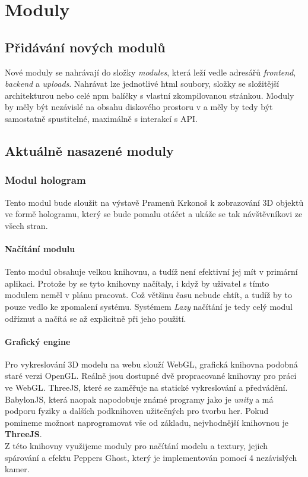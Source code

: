 \chapter{Moduly}

\section{Přidávání nových modulů}
Nové moduly se nahrávají do složky \textit{modules},
která leží vedle adresářů \textit{frontend}, \textit{backend} a \textit{uploads}.
Nahrávat lze jednotlivé html soubory, složky se složitější architekturou nebo
celé npm balíčky s vlastní zkompilovanou stránkou. Moduly by měly být nezávislé na
obsahu diskového prostoru v  a měly by tedy být samostatně spustitelné,
maximálně s interakcí s API.

\section{Aktuálně nasazené moduly}

\subsection{Modul hologram}
Tento modul bude sloužit na výstavě Pramenů Krkonoš k zobrazování 3D objektů ve formě hologramu,
který se bude pomalu otáčet a ukáže se tak návštěvníkovi ze všech stran.

\subsubsection{Načítání modulu}
Tento modul obsahuje velkou knihovnu, a tudíž není efektivní jej mít v primární aplikaci.
Protože by se tyto knihovny načítaly, i když by uživatel s tímto modulem neměl v plánu pracovat.
Což většinu času nebude chtít, a tudíž by to pouze vedlo ke zpomalení systému.
Systémem \textit{Lazy} načítání je tedy celý modul odříznut a načítá se až explicitně při jeho použití.

\subsubsection{Grafický engine}
Pro vykreslování 3D modelu na webu slouží WebGL, grafická knihovna podobná staré verzi OpenGL.
Reálně jsou dostupné dvě propracované knihovny pro práci ve WebGL.
ThreeJS, které se zaměřuje na statické vykreslování a předvádění.
BabylonJS, která naopak napodobuje známé programy jako je \textit{unity} a má podporu
fyziky a dalších podknihoven užitečných pro tvorbu her.
Pokud pomineme možnost naprogramovat vše od základu, nejvhodnější knihovnou 
je \textbf{ThreeJS}.\\
Z této knihovny využijeme moduly pro načítání modelu a textury, jejich spárování a
efektu Peppers Ghost, který je implementován pomocí 4 nezávislých kamer.


